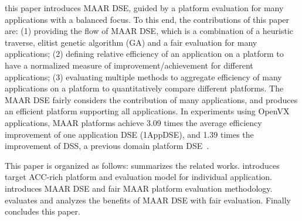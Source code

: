 


 this paper introduces MAAR DSE, guided by a platform evaluation for many applications with a balanced focus. To this end, the contributions of this paper are: (1) providing the flow of MAAR DSE, which is a combination of a heuristic traverse, elitist genetic algorithm (GA) and a fair evaluation for many applications; (2) defining relative efficiency of an application on a platform to have a normalized measure of improvement/achievement for different applications; (3) evaluating multiple methods to aggregate efficiency of many applications on a platform to quantitatively compare different platforms. The MAAR DSE fairly considers the contribution of many applications, and produces an efficient platform supporting all applications. In experiments using OpenVX applications, MAAR platforms achieve 3.09 times the average efficiency improvement of one application DSE (1AppDSE), and 1.39 times the improvement of DSS, a previous domain platform DSE~\cite{zhang2018ds}. 


This paper is organized as follows:  summarizes the related works.  introduces target ACC-rich platform and evaluation model for individual application.  introduces MAAR DSE and fair MAAR platform evaluation methodology.  evaluates and analyzes the benefits of MAAR DSE with fair evaluation. Finally  concludes this paper.


